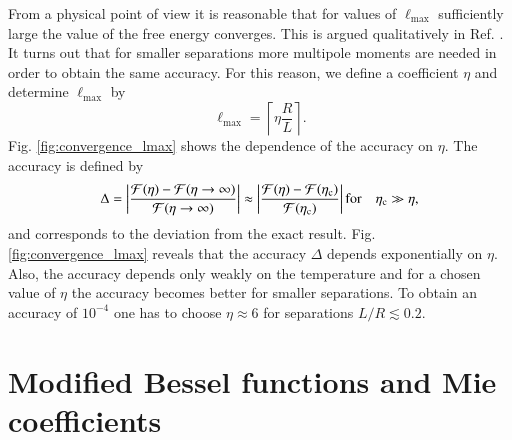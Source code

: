 From a physical point of view it is reasonable that for values of
$\ell_\text{max}$ sufficiently large the value of the free energy converges.
This is argued qualitatively in Ref. \cite{Durand}. It turns out that for
smaller separations more multipole moments are needed in order to obtain the
same accuracy. For this reason, we define a coefficient $\eta$ and determine
$\ell_\text{max}$ by
\begin{equation}
\ell_\text{max} = \left\lceil \eta \frac{R}{L} \right\rceil .
\end{equation}
Fig. \ref{fig:convergence_lmax} shows the dependence of the accuracy on
$\eta$. The accuracy is defined by
\begin{equation}
\Delta = \left| \frac{\mathcal{F}(\eta)-\mathcal{F}(\eta\to\infty)}{\mathcal{F}(\eta\to\infty)} \right|
 \approx \left| \frac{\mathcal{F}(\eta)-\mathcal{F}(\eta_\text{c})}{\mathcal{F}(\eta_\text{c})} \right| \\
 \text{for} \quad \eta_\text{c} \gg \eta,
\end{equation}
and corresponds to the deviation from the exact result. Fig.
\ref{fig:convergence_lmax} reveals that the accuracy $\Delta$ depends
exponentially on $\eta$. Also, the accuracy depends only weakly on the
temperature and for a chosen value of $\eta$ the accuracy becomes better for
smaller separations. To obtain an accuracy of $10^{-4}$ one has to choose
$\eta\approx6$ for separations $L/R \lesssim 0.2$.


\section{Modified Bessel functions and Mie coefficients}


